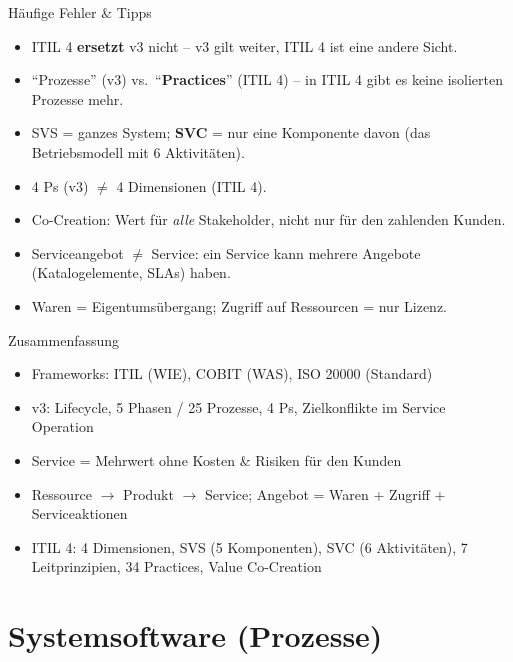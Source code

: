 \documentclass[a4paper, fontsize=7pt]{scrartcl}
\begin{document}
\begin{subbox}{Häufige Fehler \& Tipps}
\begin{itemize}
    \item ITIL 4 \textbf{ersetzt} v3 nicht -- v3 gilt weiter, ITIL 4 ist
          eine andere Sicht.
    \item ``Prozesse'' (v3) vs.\ ``\textbf{Practices}'' (ITIL 4) -- in
          ITIL 4 gibt es keine isolierten Prozesse mehr.
    \item SVS = ganzes System; \textbf{SVC} = nur eine Komponente davon
          (das Betriebsmodell mit 6 Aktivitäten).
    \item 4 Ps (v3) $\neq$ 4 Dimensionen (ITIL 4).
    \item Co-Creation: Wert für \emph{alle} Stakeholder, nicht nur für den
          zahlenden Kunden.
    \item Serviceangebot $\neq$ Service: ein Service kann mehrere Angebote
          (Katalogelemente, SLAs) haben.
    \item Waren = Eigentumsübergang; Zugriff auf Ressourcen = nur Lizenz.
\end{itemize}
\end{subbox}

\begin{subbox}{Zusammenfassung}
\begin{itemize}
    \item Frameworks: ITIL (WIE), COBIT (WAS), ISO 20000 (Standard)
    \item v3: Lifecycle, 5 Phasen / 25 Prozesse, 4 Ps, Zielkonflikte im
          Service Operation
    \item Service = Mehrwert ohne Kosten \& Risiken für den Kunden
    \item Ressource $\to$ Produkt $\to$ Service; Angebot = Waren +
          Zugriff + Serviceaktionen
    \item ITIL 4: 4 Dimensionen, SVS (5 Komponenten), SVC (6 Aktivitäten),
          7 Leitprinzipien, 34 Practices, Value Co-Creation
\end{itemize}
\end{subbox}

\section{Systemsoftware (Prozesse)}
\end{document}
